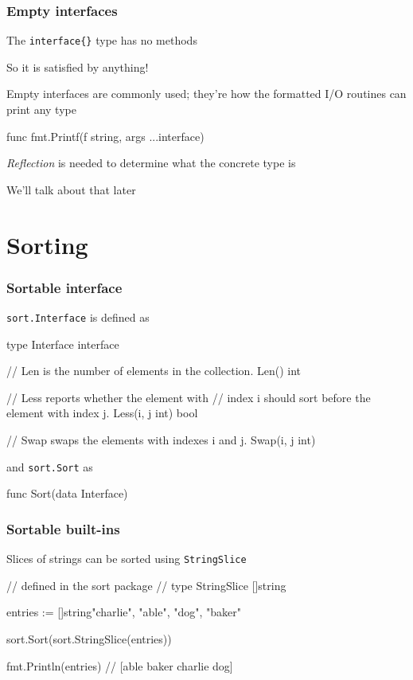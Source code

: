 \documentclass[handout,compress,t,11pt]{beamer}
\begin{document}
\begin{frame}[fragile]
    \frametitle{Empty interfaces}
    The \verb|interface{}| type has no methods \par
    \vspace{\baselineskip}
    So it is satisfied by anything! \par
    \vspace{\baselineskip}
    Empty interfaces are commonly used; they're how the formatted
    I/O routines can print any type
\begin{golang}
func fmt.Printf(f string, args ...interface{})
\end{golang}
    \vspace{2\baselineskip}
    {\em Reflection} is needed to determine what the concrete type is \par
    \vspace{0.4\baselineskip}
    We'll talk about that later
\end{frame}


\section{Sorting}

\begin{frame}[fragile]
    \frametitle{Sortable interface}
    \verb|sort.Interface| is defined as \par
\begin{golang}
type Interface interface {
    // Len is the number of elements in the collection.
    Len() int

    // Less reports whether the element with
    // index i should sort before the element with index j.
    Less(i, j int) bool

    // Swap swaps the elements with indexes i and j.
    Swap(i, j int)
}
\end{golang}
    \vspace{0.6\baselineskip}
    and \verb|sort.Sort| as \par
\begin{golang}
func Sort(data Interface)
\end{golang}
\end{frame}

\begin{frame}[fragile]
    \frametitle{Sortable built-ins}
    Slices of strings can be sorted using \verb|StringSlice| \par
    \vspace{\baselineskip}
\begin{golang}
//  defined in the sort package
//  type StringSlice []string

entries := []string{"charlie", "able", "dog", "baker"}

sort.Sort(sort.StringSlice(entries))

fmt.Println(entries)   // [able baker charlie dog]
\end{golang}
\end{frame}
\end{document}
